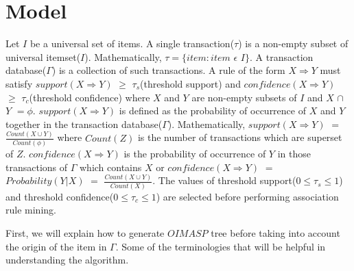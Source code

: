 \documentclass[preprint]{elsarticle}
\begin{document}
\section{Model}
Let $ I $ be a universal set of items. A single transaction($ \tau $) is a non-empty subset of universal itemset($ I $). Mathematically, $ \tau = \lbrace item : item$ $\epsilon $ $ I \rbrace$. A transaction database($ \Gamma $) is a collection of such transactions. A rule of the form $ X \Rightarrow  Y $ must satisfy $ support(X \Rightarrow Y) $ $ \geq $ $ \tau _{s} $(threshold support) and $ confidence(X \Rightarrow Y) $ $ \geq $ $ \tau _{c} $(threshold confidence) where $ X $ and $ Y $ are non-empty subsets of $ I $ and $ X $ $ \cap $ $ Y $ $ = \phi $. $ support(X \Rightarrow Y) $ is defined as the probability of occurrence of $ X $ and $ Y $ together in the transaction database($ \Gamma $). Mathematically, $ support(X \Rightarrow Y) $ $ = $ $ \frac{Count(X \cup Y)}{Count(\phi)} $ where $ Count(Z) $ is the number of transactions which are superset of $ Z $. $ confidence(X \Rightarrow Y) $ is the probability of occurrence of $ Y $ in those transactions of $ \Gamma $ which contains $ X $ or $ confidence(X \Rightarrow Y) $ $ = $ $ Probability(Y  \vert  X) $ $ = $ $ \frac{Count(X \cup Y)}{Count(X)} $. The values of threshold support($ 0 \leq \tau _{s} \leq 1 $) and threshold confidence($ 0 \leq \tau _{c} \leq 1 $) are selected before performing association rule mining.

First, we will explain how to generate $ OIMASP $ tree before taking into account the origin of the item in $ \Gamma $. Some of the terminologies that will be helpful in understanding the algorithm.
\end{document}
